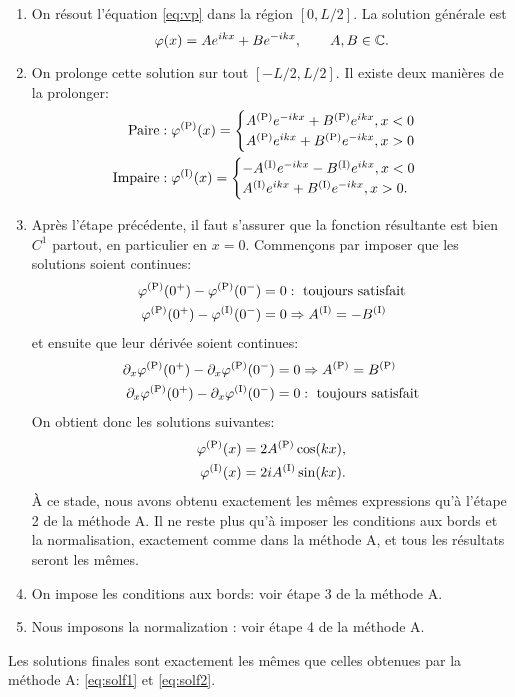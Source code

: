 \documentclass[11pt,a4paper,oneside]{article}
\begin{document}
\begin{enumerate}
    \item On résout l'équation \eqref{eq:vp} dans la région $[0,L/2]$. La solution générale est
    \begin{equation}
        \varphi(x)=Ae^{ikx}+Be^{-ikx},\qquad A,B\in\mathbb{C}.
    \end{equation}
    \item On prolonge cette solution sur tout $[-L/2,L/2]$. Il existe deux manières de la prolonger:
    \begin{align}
        \text{Paire} &: \varphi^{(\text{P})}(x)=
        \begin{cases}
            A^{(\text{P})} e^{-ikx}+B^{(\text{P})} e^{ikx}, x<0\\
            A^{(\text{P})} e^{ikx}+B^{(\text{P})} e^{-ikx}, x>0
        \end{cases}\\
        \text{Impaire} &: \varphi^{(\text{I})}(x)=
        \begin{cases}
            -A^{(\text{I})} e^{-ikx}-B^{(\text{I})} e^{ikx}, x<0\\
            A^{(\text{I})} e^{ikx}+B^{(\text{I})} e^{-ikx}, x>0.
        \end{cases}
    \end{align}
    \item Après l'étape précédente, il faut s'assurer que la fonction résultante est bien $C^1$ partout, en particulier en $x=0$. Commençons par imposer que les solutions soient continues:
    \begin{align}
        \varphi^{(\text{P})}(0^+)-\varphi^{(\text{P})}(0^-)&=0 : \text{ toujours satisfait}\\
        \varphi^{(\text{P})}(0^+)-\varphi^{(\text{I})}(0^-)&=0 \Rightarrow A^{(\text{I})} = -B^{(\text{I})}
    \end{align}
    et ensuite que leur dérivée soient continues:
    \begin{align}
        \partial_x\varphi^{(\text{P})}(0^+)-\partial_x\varphi^{(\text{P})}(0^-)&=0 \Rightarrow A^{(\text{P})} = B^{(\text{P})}\\
        \partial_x\varphi^{(\text{P})}(0^+)-\partial_x\varphi^{(\text{I})}(0^-)&=0 : \text{ toujours satisfait}
    \end{align}
    On obtient donc les solutions suivantes:
    \begin{align}
        \varphi^{(\text{P})}(x) &= 2A^{(\text{P})}\cos(kx),\\
        \varphi^{(\text{I})}(x) &= 2iA^{(\text{I})}\sin(kx).
    \end{align}
    À ce stade, nous avons obtenu exactement les mêmes expressions qu'à l'étape 2 de la méthode A. Il ne reste plus qu'à imposer les conditions aux bords et la normalisation, exactement comme dans la méthode A, et tous les résultats seront les mêmes.
    \item On impose les conditions aux bords: voir étape 3 de la méthode A.
    \item Nous imposons la normalization : voir étape 4 de la méthode A.
\end{enumerate}
Les solutions finales sont exactement les mêmes que celles obtenues par la méthode A: \eqref{eq:solf1} et \eqref{eq:solf2}.
\end{document}
